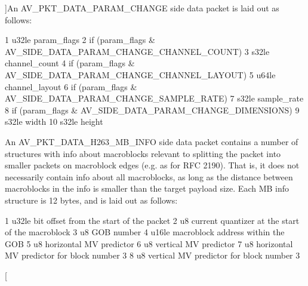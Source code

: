 \begin{Desc}
\begin{description}
{}]An A\+V\+\_\+\+P\+K\+T\+\_\+\+D\+A\+T\+A\+\_\+\+P\+A\+R\+A\+M\+\_\+\+C\+H\+A\+N\+GE side data packet is laid out as follows\+: 
\begin{DoxyCode}
1 u32le param\_flags
2 if (param\_flags & AV\_SIDE\_DATA\_PARAM\_CHANGE\_CHANNEL\_COUNT)
3     s32le channel\_count
4 if (param\_flags & AV\_SIDE\_DATA\_PARAM\_CHANGE\_CHANNEL\_LAYOUT)
5     u64le channel\_layout
6 if (param\_flags & AV\_SIDE\_DATA\_PARAM\_CHANGE\_SAMPLE\_RATE)
7     s32le sample\_rate
8 if (param\_flags & AV\_SIDE\_DATA\_PARAM\_CHANGE\_DIMENSIONS)
9     s32le width
10     s32le height
\end{DoxyCode}
 \item[{\em 
A\+V\+\_\+\+P\+K\+T\+\_\+\+D\+A\+T\+A\+\_\+\+H263\+\_\+\+M\+B\+\_\+\+I\+N\+FO\hypertarget{group__lavc__packet_gga9a80bfcacc586b483a973272800edb97a48dc789fa9d31046e153233374f52b86}{}\label{group__lavc__packet_gga9a80bfcacc586b483a973272800edb97a48dc789fa9d31046e153233374f52b86}
}]An A\+V\+\_\+\+P\+K\+T\+\_\+\+D\+A\+T\+A\+\_\+\+H263\+\_\+\+M\+B\+\_\+\+I\+N\+FO side data packet contains a number of structures with info about macroblocks relevant to splitting the packet into smaller packets on macroblock edges (e.\+g. as for R\+FC 2190). That is, it does not necessarily contain info about all macroblocks, as long as the distance between macroblocks in the info is smaller than the target payload size. Each MB info structure is 12 bytes, and is laid out as follows\+: 
\begin{DoxyCode}
1 u32le bit offset from the start of the packet
2 u8    current quantizer at the start of the macroblock
3 u8    GOB number
4 u16le macroblock address within the GOB
5 u8    horizontal MV predictor
6 u8    vertical MV predictor
7 u8    horizontal MV predictor for block number 3
8 u8    vertical MV predictor for block number 3
\end{DoxyCode}
 \item[{\em 
}
\end{description}
\end{Desc}
